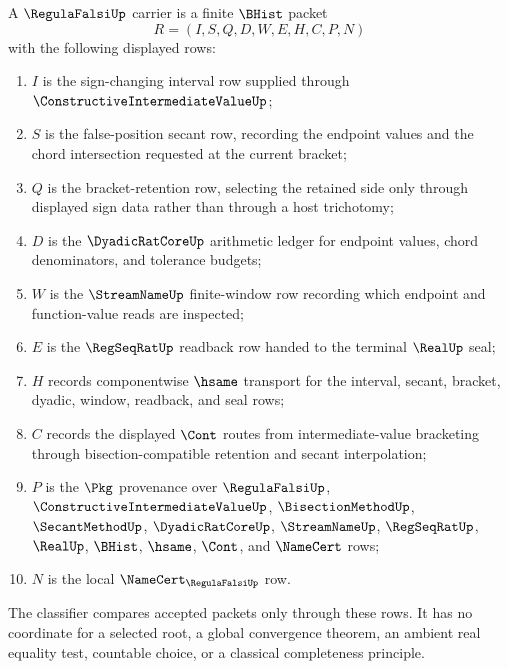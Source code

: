 \begin{definition}
\label{def:regula-falsi-carrier}
A $\RegulaFalsiUp$ carrier is a finite $\BHist$ packet
$$
R=(I,S,Q,D,W,E,H,C,P,N)
$$
with the following displayed rows:
\begin{enumerate}
\item $I$ is the sign-changing interval row supplied through $\ConstructiveIntermediateValueUp$;
\item $S$ is the false-position secant row, recording the endpoint values and the chord intersection requested at the current bracket;
\item $Q$ is the bracket-retention row, selecting the retained side only through displayed sign data rather than through a host trichotomy;
\item $D$ is the $\DyadicRatCoreUp$ arithmetic ledger for endpoint values, chord denominators, and tolerance budgets;
\item $W$ is the $\StreamNameUp$ finite-window row recording which endpoint and function-value reads are inspected;
\item $E$ is the $\RegSeqRatUp$ readback row handed to the terminal $\RealUp$ seal;
\item $H$ records componentwise $\hsame$ transport for the interval, secant, bracket, dyadic, window, readback, and seal rows;
\item $C$ records the displayed $\Cont$ routes from intermediate-value bracketing through bisection-compatible retention and secant interpolation;
\item $P$ is the $\Pkg$ provenance over $\RegulaFalsiUp$, $\ConstructiveIntermediateValueUp$, $\BisectionMethodUp$, $\SecantMethodUp$, $\DyadicRatCoreUp$, $\StreamNameUp$, $\RegSeqRatUp$, $\RealUp$, $\BHist$, $\hsame$, $\Cont$, and $\NameCert$ rows;
\item $N$ is the local $\NameCert_{\RegulaFalsiUp}$ row.
\end{enumerate}
The classifier compares accepted packets only through these rows. It has no coordinate for a selected root, a global convergence theorem, an ambient real equality test, countable choice, or a classical completeness principle.
\end{definition}

